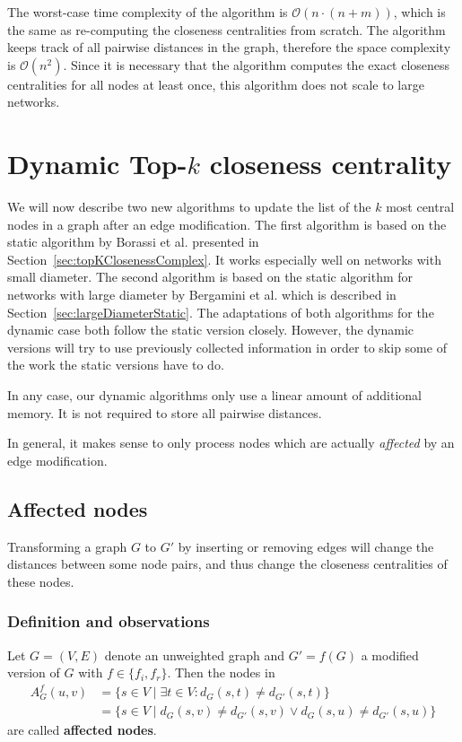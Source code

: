 The worst-case time complexity of the algorithm is $\mathcal{O}(n \cdot (n + m))$, which is the same as re-computing the closeness centralities from scratch. The algorithm keeps track of all pairwise distances in the graph, therefore the space complexity is $\mathcal{O}(n^2)$. Since it is necessary that the algorithm computes the exact closeness centralities for all nodes at least once, this algorithm does not scale to large networks.

\section{Dynamic Top-$k$ closeness centrality}
We will now describe two new algorithms to update the list of the $k$ most central nodes in a graph after an edge modification. The first algorithm is based on the static algorithm by Borassi et al. presented in Section~\ref{sec:topKClosenessComplex}. It works especially well on networks with small diameter. The second algorithm is based on the static algorithm for networks with large diameter by Bergamini et al. which is described in Section~\ref{sec:largeDiameterStatic}. The adaptations of both algorithms for the dynamic case both follow the static version closely. However, the dynamic versions will try to use previously collected information in order to skip some of the work the static versions have to do.

In any case, our dynamic algorithms only use a linear amount of additional memory. It is not required to store all pairwise distances.

In general, it makes sense to only process nodes which are actually \emph{affected} by an edge modification. 

\subsection{Affected nodes}

Transforming a graph $G$ to $G'$ by inserting or removing edges will change the distances between some node pairs, and thus change the closeness centralities of these nodes.

\subsubsection{Definition and observations}

\begin{definition}
\label{def:affectedNodes}
	Let $G = (V, E)$ denote an unweighted graph and $G' = f(G)$ a modified version of $G$ with $f \in \{f_i, f_r\}$. Then the nodes in 
	\begin{align}
		A_G^f(u, v) &= \{s \in V \mid \exists t \in V : d_G(s,t) \neq d_{G'}(s, t)\} \label{eq:affectedNodesGeneral} \\
		            &=\{s \in V \mid d_G(s, v) \neq d_{G'}(s, v) \lor d_G(s, u) \neq d_{G'}(s, u)\} \label{eq:affectedNodesSimplified}
	\end{align} are called \textbf{affected nodes}.
\end{definition}
 
